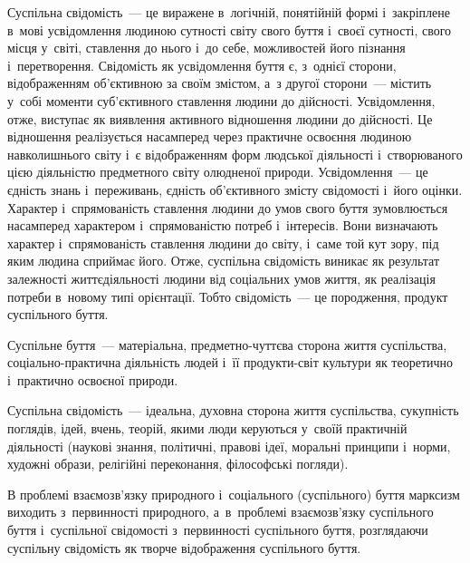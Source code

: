 \documentclass[a5paper,oneside,DIV=12,12pt,headings=small]{scrartcl}
\begin{document}
		Суспільна свідомість~— це виражене в~логічній, понятійній формі і~закріплене в~мові усвідомлення людиною сутності світу свого буття і~своєї сутності, свого місця у~світі, ставлення до нього і~до себе, можливостей його пізнання і~перетворення. Свідомість як усвідомлення буття є, з~однієї сторони, відображенням об'\-єктивною за своїм змістом, а~з другої сторони~— містить у~собі моменти суб'\-єктивного ставлення людини до дійсності. Усвідомлення, отже, виступає як виявлення активного відношення людини до дійсності. Це відношення реалізується насамперед через практичне освоєння людиною навколишнього світу і~є відображенням форм людської діяльності і~створюваного цією діяльністю предметного світу олюдненої природи. Усвідомлення~— це єдність знань і~переживань, єдність об'\-єктивного змісту свідомості і~його оцінки. Характер і~спрямованість ставлення людини до умов свого буття зумовлюється насамперед характером і~спрямованістю потреб і~інтересів. Вони визначають характер і~спрямованість ставлення людини до світу, і~саме той кут зору, під яким людина сприймає його. Отже, суспільна свідомість виникає як результат залежності життєдіяльності людини від соціальних умов життя, як реалізація потреби в~новому типі орієнтації. Тобто свідомість~— це породження, продукт суспільного буття.
		 
		Суспільне буття~— матеріальна, предметно-чуттєва сторона життя суспільства, соціально-практична діяльність людей і~її продукти-світ культури як теоретично і~практично освоєної природи.
		
		Суспільна свідомість~— ідеальна, духовна сторона життя суспільства, сукупність поглядів, ідей, вчень, теорій, якими люди керуються у~своїй практичній діяльності (наукові знання, політичні, правові ідеї, моральні принципи і~норми, художні образи, релігійні переконання, філософські погляди).
		
		В проблемі взаємозв'язку природного і~соціального (суспільного) буття марксизм виходить з~первинності природного, а~в~проблемі взаємозв'язку суспільного буття і~суспільної свідомості з~первинності суспільного буття, розглядаючи суспільну свідомість як творче відображення суспільного буття.

\end{document}
